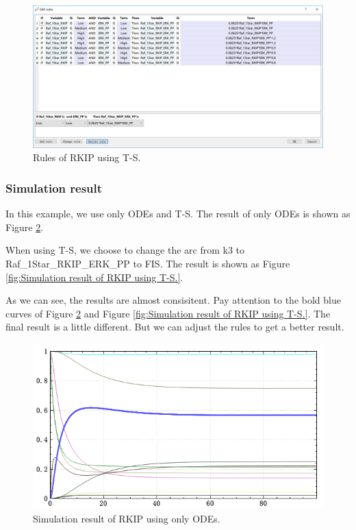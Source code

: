 \documentclass[journal,a4paper,onecolumn]{article}
\begin{document}
\begin{figure}[!hbt]
	\begin{center}
		\includegraphics[width=\columnwidth]{fig46}
		\caption{Rules of RKIP using T-S.}
		\label{fig:Rules of RKIP using T-S.}
	\end{center}
\end{figure}


\subsubsection{Simulation result}
In this example, we use only ODEs and T-S. The result of only ODEs is shown as Figure \ref{fig:Simulation result of RKIP using only ODEs.}.

When using T-S, we choose to change the arc from k3 to Raf\_1Star\_RKIP\_ERK\_PP to FIS. The result is shown as Figure \ref{fig:Simulation result of RKIP using T-S.}.

As we can see, the results are almost consisitent. Pay attention to the bold blue curves of Figure \ref{fig:Simulation result of RKIP using only ODEs.} and Figure \ref{fig:Simulation result of RKIP using T-S.}. The final result is a little different. But we can adjust the rules to get a better result.

\begin{figure}[!hbt]
	\begin{center}
		\includegraphics[width=\columnwidth]{fig29}
		\caption{Simulation result of RKIP using only ODEs.}
		\label{fig:Simulation result of RKIP using only ODEs.}
	\end{center}
\end{figure}
\end{document}
